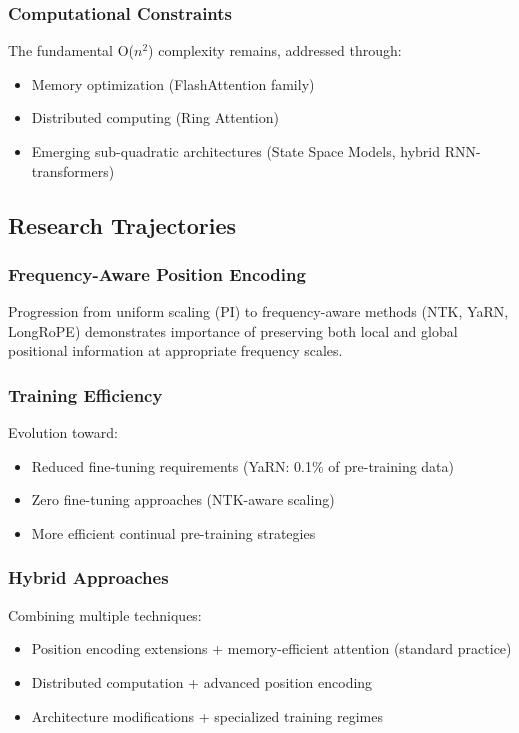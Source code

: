 \documentclass[11pt,letterpaper]{article}
\begin{document}
\subsubsection{Computational Constraints}
The fundamental O($n^2$) complexity remains, addressed through:
\begin{itemize}[leftmargin=*]
    \item Memory optimization (FlashAttention family)
    \item Distributed computing (Ring Attention)
    \item Emerging sub-quadratic architectures (State Space Models, hybrid RNN-transformers)
\end{itemize}

\subsection{Research Trajectories}

\subsubsection{Frequency-Aware Position Encoding}
Progression from uniform scaling (PI) to frequency-aware methods (NTK, YaRN, LongRoPE) demonstrates importance of preserving both local and global positional information at appropriate frequency scales.

\subsubsection{Training Efficiency}
Evolution toward:
\begin{itemize}[leftmargin=*]
    \item Reduced fine-tuning requirements (YaRN: 0.1\% of pre-training data)
    \item Zero fine-tuning approaches (NTK-aware scaling)
    \item More efficient continual pre-training strategies
\end{itemize}

\subsubsection{Hybrid Approaches}
Combining multiple techniques:
\begin{itemize}[leftmargin=*]
    \item Position encoding extensions + memory-efficient attention (standard practice)
    \item Distributed computation + advanced position encoding
    \item Architecture modifications + specialized training regimes
\end{itemize}
\end{document}
